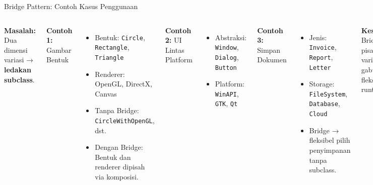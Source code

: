 \documentclass[aspectratio=169, table]{beamer}
\begin{document}
\begin{frame}[fragile]{Bridge Pattern: Contoh Kasus Penggunaan}
	\vspace{20pt}
	\begin{columns}[T]
		\textbf{Masalah:} Dua dimensi variasi → \textbf{ledakan subclass}.
		
		\textbf{Contoh 1:} Gambar Bentuk
		\begin{itemize}
			\item Bentuk: \texttt{Circle}, \texttt{Rectangle}, \texttt{Triangle}
			\item Renderer: OpenGL, DirectX, Canvas
			\item Tanpa Bridge: \texttt{CircleWithOpenGL}, dst.
			\item Dengan Bridge: Bentuk dan renderer dipisah via komposisi.
		\end{itemize}
		
		\textbf{Contoh 2:} UI Lintas Platform
		\begin{itemize}
			\item Abstraksi: \texttt{Window}, \texttt{Dialog}, \texttt{Button}
			\item Platform: \texttt{WinAPI}, \texttt{GTK}, \texttt{Qt}
		\end{itemize}
		
		\textbf{Contoh 3:} Simpan Dokumen
		\begin{itemize}
			\item Jenis: \texttt{Invoice}, \texttt{Report}, \texttt{Letter}
			\item Storage: \texttt{FileSystem}, \texttt{Database}, \texttt{Cloud}
			\item Bridge → fleksibel pilih penyimpanan tanpa subclass.
		\end{itemize}
		
		\vspace{4pt}
		\textbf{Kesimpulan:} Bridge pisahkan variasi dan gabungkan fleksibel saat runtime.
	\end{columns}
\end{frame}
\end{document}
